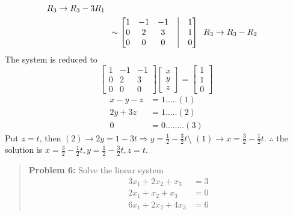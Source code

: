 \documentclass[
  letterpaper,
  DIV=11,
  numbers=noendperiod]{scrreprt}
\begin{document}
\begin{align*}
\begin{array}{c}
        R_3\rightarrow R_3-3R_1
    \end{array}\\
    &\sim \begin{bmatrix}
        1 &-1  &-1 &\bigm| &1\\
        0 &2 &3 &\bigm| &1\\
        0 &0 &0 &\bigm| &0
    \end{bmatrix}\begin{array}{c}
        R_3\rightarrow R_3-R_2
    \end{array}
\end{align*} The system is reduced to \[\begin{bmatrix}
    1 &-1 &-1\\
    0 &2 &3\\
    0 &0 &0
\end{bmatrix}\begin{bmatrix}
    x\\
    y\\
    z
\end{bmatrix}=\begin{bmatrix}
    1\\
    1\\
    0
\end{bmatrix}\] \begin{align*}
    x-y-z &=1.....(1)\\
    2y+3z &=1.....(2)\\
    0 &=0........(3)
\end{align*} Put \(z=t\), then
\((2)\rightarrow 2y=1-3t\Rightarrow y=\frac{1}{2}-\frac{3}{2}t\)\textbackslash{}
\((1)\rightarrow x=\frac{3}{2}-\frac{1}{2}t\). \(\therefore\) the
solution is
\(x=\frac{3}{2}-\frac{1}{2}t, y=\frac{1}{2}-\frac{3}{2}t, z=t\).

\begin{quote}
\textbf{Problem 6:} Solve the linear system \begin{align*}
3x_1+2x_2+x_3 &=3\\
2x_1+x_2+x_3 &=0\\
6x_1+2x_2+4x_3 &= 6
\end{align*}
\end{quote}
\end{document}
